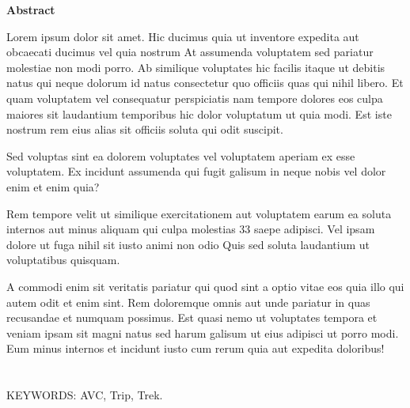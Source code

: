 \thispagestyle{empty}
\begin{center}
{\Large \bf Abstract}\\ 
\end{center}



Lorem ipsum dolor sit amet. Hic ducimus quia ut inventore expedita aut obcaecati ducimus vel quia nostrum At assumenda voluptatem sed pariatur molestiae non modi porro. Ab similique voluptates hic facilis itaque ut debitis natus qui neque dolorum id natus consectetur quo officiis quas qui nihil libero. Et quam voluptatem vel consequatur perspiciatis nam tempore dolores eos culpa maiores sit laudantium temporibus hic dolor voluptatum ut quia modi. Est iste nostrum rem eius alias sit officiis soluta qui odit suscipit.

Sed voluptas sint ea dolorem voluptates vel voluptatem aperiam ex esse voluptatem. Ex incidunt assumenda qui fugit galisum in neque nobis vel dolor enim et enim quia?

Rem tempore velit ut similique exercitationem aut voluptatem earum ea soluta internos aut minus aliquam qui culpa molestias 33 saepe adipisci. Vel ipsam dolore ut fuga nihil sit iusto animi non odio Quis sed soluta laudantium ut voluptatibus quisquam.

A commodi enim sit veritatis pariatur qui quod sint a optio vitae eos quia illo qui autem odit et enim sint. Rem doloremque omnis aut unde pariatur in quas recusandae et numquam possimus. Est quasi nemo ut voluptates tempora et veniam ipsam sit magni natus sed harum galisum ut eius adipisci ut porro modi. Eum minus internos et incidunt iusto cum rerum quia aut expedita doloribus! 
\\
\\
\\
KEYWORDS: AVC, Trip, Trek. 